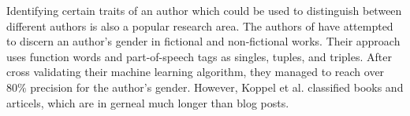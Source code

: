 Identifying certain traits of an author which could be used to distinguish between different authors is also a popular research area.
The authors of \cite{koppel2003automatically} have attempted to discern an author's gender in fictional and non-fictional works.
Their approach uses function words and part-of-speech tags as singles, tuples, and triples.
After cross validating their machine learning algorithm, they managed to reach over $80\%$ precision for the author's gender.
However, Koppel et al. classified books and articels, which are in gerneal much longer than blog posts.